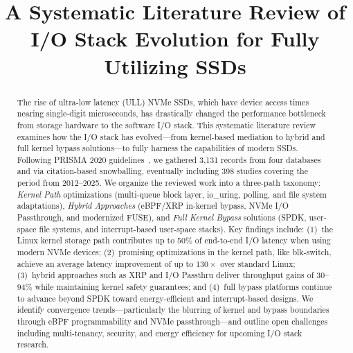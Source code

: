\documentclass[conference]{IEEEtran}
\begin{document}
\title{A Systematic Literature Review of I/O Stack Evolution for Fully Utilizing SSDs}

\author{
\and
{}
}

\maketitle

\begin{abstract}
The rise of ultra-low latency (ULL) NVMe SSDs, which have device access times nearing single-digit microseconds, has drastically changed the performance bottleneck from storage hardware to the software I/O stack. This systematic literature review examines how the I/O stack has evolved---from kernel-based mediation to hybrid and full kernel bypass solutions---to fully harness the capabilities of modern SSDs. Following PRISMA 2020 guidelines~\cite{page2021prisma}, we gathered 3{,}131 records from four databases and via citation-based snowballing, eventually including 398 studies covering the period from 2012--2025. We organize the reviewed work into a three-path taxonomy: \emph{Kernel Path} optimizations (multi-queue block layer, io\_uring, polling, and file system adaptations), \emph{Hybrid Approaches} (eBPF/XRP in-kernel bypass, NVMe I/O Passthrough, and modernized FUSE), and \emph{Full Kernel Bypass} solutions (SPDK, user-space file systems, and interrupt-based user-space stacks). Key findings include: (1)~the Linux kernel storage path contributes up to 50\% of end-to-end I/O latency when using modern NVMe devices; (2)~promising optimizations in the kernel path, like blk-switch, achieve an average latency improvement of up to $130\times$ over standard Linux; (3)~hybrid approaches such as XRP and I/O Passthru deliver throughput gains of 30--94\% while maintaining kernel safety guarantees; and (4)~full bypass platforms continue to advance beyond SPDK toward energy-efficient and interrupt-based designs. We identify convergence trends---particularly the blurring of kernel and bypass boundaries through eBPF programmability and NVMe passthrough---and outline open challenges including multi-tenancy, security, and energy efficiency for upcoming I/O stack research.
\end{abstract}
\end{document}
